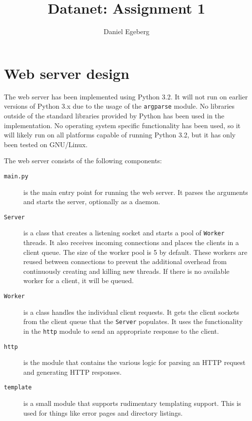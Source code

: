 \documentclass{../sig-alternate}
\begin{document}
\title{Datanet: Assignment 1}


\author{
\alignauthor
    Daniel Egeberg\\
}

\maketitle

\begin{abstract}
    \lipsum[1]
\end{abstract}

\section{Web server design}

The web server has been implemented using Python 3.2. It will not run on
earlier versions of Python 3.x due to the usage of the \verb+argparse+
module. No libraries outside of the standard libraries provided by Python has
been used in the implementation. No operating system specific functionality
has been used, so it will likely run on all platforms capable of running
Python 3.2, but it has only been tested on GNU/Linux.

The web server consists of the following components:

\begin{description}
    \item[\texttt{main.py}] is the main entry point for running the web
        server. It parses the arguments and starts the server, optionally as a
        daemon.
    \item[\texttt{Server}] is a class that creates a listening socket
        and starts a pool of \texttt{Worker} threads. It also receives
        incoming connections and places the clients in a client queue. The
        size of the worker pool is 5 by default. These workers are reused
        between connections to prevent the additional overhead from
        continuously creating and killing new threads. If there is no
        available worker for a client, it will be queued.
    \item[\texttt{Worker}] is a class handles the individual client requests.
        It gets the client sockets from the client queue that the
        \texttt{Server} populates. It uses the functionality in the
        \texttt{http} module to send an appropriate response to the client.
    \item[\texttt{http}] is the module that contains the various logic for
        parsing an HTTP request and generating HTTP responses.
    \item[\texttt{template}] is a small module that supports rudimentary
        templating support. This is used for things like error pages and
        directory listings.
\end{description}
\end{document}
